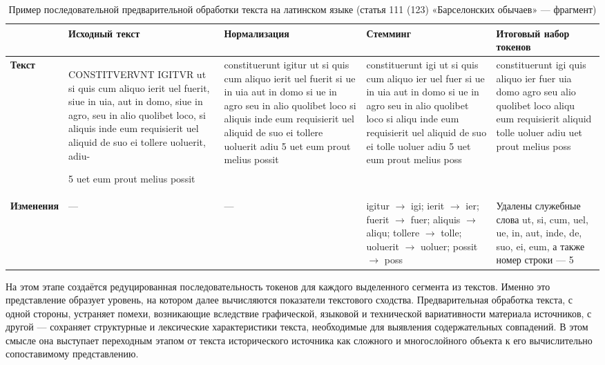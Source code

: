 \begin{center}
\small
\setlength{\tabcolsep}{2pt}
\begin{longtable}{|p{}|p{}|p{}|p{}|p{}|}
\caption{Пример последовательной предварительной обработки текста на латинском языке (статья 111 (123) «Барселонских обычаев» --- фрагмент)}\label{tab:ch1-preprocessing}\\
\hline
 & \textbf{Исходный текст} & \textbf{Нормализ}\textbf{ация} & \textbf{Стемми}\textbf{нг} & \textbf{Итоговый набор токенов} \\ \hline
\textbf{Текст} & CONSTITVERVNT IGITVR ut si quis cum aliquo ierit uel fuerit, siue in uia, aut in domo, siue in agro, seu in alio quolibet loco, si aliquis inde eum requisierit uel aliquid de suo ei tollere uoluerit, adiu-\par 5 uet eum prout melius possit & constituerunt igitur ut si quis cum aliquo ierit uel fuerit si ue in uia aut in domo si ue in agro seu in alio quolibet loco si aliquis inde eum requisierit uel aliquid de suo ei tollere uoluerit adiu 5 uet eum prout melius possit & constituerunt igi ut si quis cum aliquo ier uel fuer si ue in uia aut in domo si ue in agro seu in alio quolibet loco si aliqu inde eum requisierit uel aliquid de suo ei tolle uoluer adiu 5 uet eum prout melius poss & constituerunt igi quis aliquo ier fuer uia domo agro seu alio quolibet loco aliqu eum requisierit aliquid tolle uoluer adiu uet prout melius poss \\ \hline
\textbf{Изменения} & --- & --- & igitur $\rightarrow$ igi; ierit $\rightarrow$ ier; fuerit $\rightarrow$ fuer; aliquis $\rightarrow$ aliqu; tollere $\rightarrow$ tolle; uoluerit $\rightarrow$ uoluer; possit $\rightarrow$ poss & Удалены служебные слова ut, si, cum, uel, ue, in, aut, inde, de, suo, ei, eum, а также номер строки --- 5 \\ \hline
\end{longtable}
\end{center}

На этом этапе создаётся редуцированная последовательность токенов для каждого выделенного сегмента из текстов. Именно это представление образует уровень, на котором далее вычисляются показатели текстового сходства. Предварительная обработка текста, с одной стороны, устраняет помехи, возникающие вследствие графической, языковой и технической вариативности материала источников, с другой --- сохраняет структурные и лексические характеристики текста, необходимые для выявления содержательных совпадений. В этом смысле она выступает переходным этапом от текста исторического источника как сложного и многослойного объекта к его вычислительно сопоставимому представлению.

